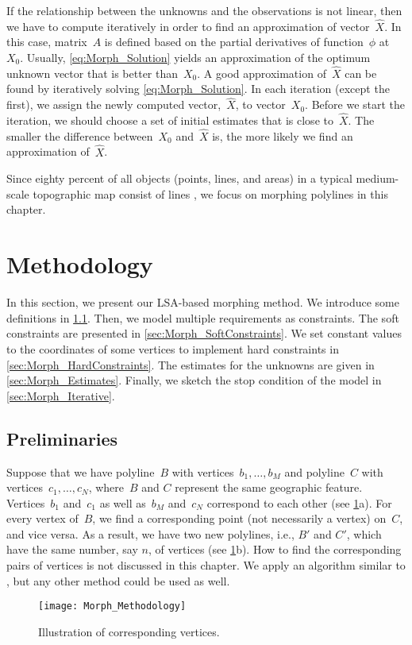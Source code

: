 If the relationship 
between the unknowns and the observations is not linear,
then we have to compute iteratively 
in order to find an approximation of vector~$\hat{X}$. 
In this case, matrix~$A$ is defined based on 
the partial derivatives of function~$\phi$ at~$X_0$.
Usually, \eq\ref{eq:Morph_Solution} yields 
an approximation of the optimum 
unknown vector that is better than~$X_0$. 
A good approximation of~$\hat{X}$ can be 
found by iteratively solving \eq\ref{eq:Morph_Solution}. 
In each iteration (except the first),
we assign the newly computed vector,~$\hat{X}$, 
to vector~$X_0$.
Before we start the iteration, we should choose
a set of initial estimates that is close to~$\hat{X}$. 
The smaller the difference between~$X_0$ and~$\hat{X}$ is,
the more likely we find an approximation of~$\hat{X}$.

Since eighty percent of all objects (points, lines, and areas) 
in a typical medium-scale topographic map consist of lines
\parencite{Muller1991}, 
we focus on morphing polylines in this chapter.


\section{Methodology}
\label{sec:Morph_Methodology}
In this section, we present our LSA-based morphing method. 
We introduce some 
definitions in \sect\ref{sec:Morph_Preliminaries}. 
Then, we model multiple requirements as constraints. 
The soft constraints are presented in 
\sect\ref{sec:Morph_SoftConstraints}. 
We set constant values to the coordinates of some 
vertices to implement hard constraints in 
\sect\ref{sec:Morph_HardConstraints}. 
The estimates for the unknowns are given in 
\sect\ref{sec:Morph_Estimates}. 
Finally, we sketch the stop condition of the model in 
\sect\ref{sec:Morph_Iterative}.

\subsection{Preliminaries}
\label{sec:Morph_Preliminaries}
Suppose that we have
polyline~$B$ with vertices~$b_1, \dots,b_M$ and 
polyline~$C$ with vertices~$c_1,\dots,c_N$, 
where~$B$ and $C$ represent the same geographic feature. 
Vertices~$b_1$ and~$c_1$ as well as~$b_M$ and~$c_N$ correspond 
to each other (see \fig\ref{fig:Morph_Injection}a). 
For every vertex of~$B$, we find a corresponding point (not 
necessarily a vertex) on~$C$, and vice versa. 
As a result, we have two new polylines, i.e., $B'$ and $C'$,
which have the same number, say $n$, of vertices
(see \fig\ref{fig:Morph_Injection}b).
How to find the corresponding pairs of vertices 
is not discussed in this chapter. 
We apply an algorithm similar to
\textcite{Noellenburg2008}, 
but any other method could be used as well.
\begin{figure}[tb]
\centering	
\texttt{[image: Morph\_Methodology]}
\caption{Illustration of corresponding vertices.}
\label{fig:Morph_Injection}
\end{figure}




